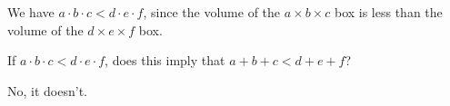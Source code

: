 



We have $a\cdot b\cdot c < d \cdot e \cdot f$, since the volume of the $a\times b\times c$ box is less than the volume of the $d\times e\times f$ box.

If $a\cdot b\cdot c<d\cdot e \cdot f$, does this imply that $a+b+c<d+e+f$?

















No, it doesn't.


